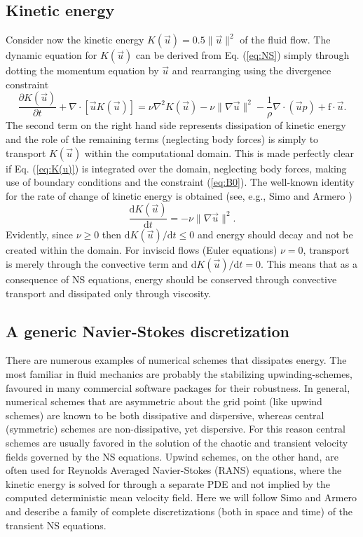 \subsection{Kinetic energy}
\label{sec:kinetic}
Consider now the kinetic energy $K(\vec{u})=0.5 \| \vec{u}\|^2$ of the
fluid flow. The dynamic equation for $K(\vec{u})$ can be derived from
Eq. (\ref{eq:NS}) simply through dotting the momentum equation by
$\vec{u}$ and rearranging using the divergence constraint
\begin{equation}
 \frac{\partial K(\vec{u})}{\partial t} + \nabla \cdot [\vec{u}K(\vec{u})] = \nu \nabla^2 K(\vec{u}) -\nu \| \nabla \vec{u} \|^2 - \frac{1}{\rho}\nabla \cdot \left(\vec{u}p \right) +\text{f}\cdot \vec{u}.
 \label{eq:K(u)}
\end{equation}
The second term on the right hand side represents dissipation of
kinetic energy and the role of the remaining terms (neglecting body
forces) is simply to transport $K(\vec{u})$ within the computational
domain. This is made perfectly clear if Eq. (\ref{eq:K(u)}) is
integrated over the domain, neglecting body forces, making use of
boundary conditions and the constraint (\ref{eq:B0}). The well-known
identity for the rate of change of kinetic energy is obtained (see,
e.g., Simo and Armero \cite{simo94})
\begin{equation}
 \frac{\text{d} K(\vec{u})}{\text{d} t} = -\nu \| \nabla \vec{u} \|^2.
\end{equation}
Evidently, since $\nu \ge 0$ then $\text{d} K(\vec{u})/\text{d} t \le
0$ and energy should decay and not be created within the domain. For
inviscid flows (Euler equations) $\nu=0$, transport is merely through
the convective term and $\text{d} K(\vec{u})/\text{d} t = 0$. This
means that as a consequence of NS equations, energy should be
conserved through convective transport and dissipated only through
viscosity.

\subsection{A generic Navier-Stokes discretization}
\label{sec:NS-solver}
There are numerous examples of numerical schemes that dissipates energy. The most familiar in fluid mechanics are probably the stabilizing upwinding-schemes, favoured in many commercial software packages for their robustness. In general, numerical schemes that are asymmetric about the grid point (like upwind schemes) are known to be both dissipative and dispersive, whereas central (symmetric) schemes are non-dissipative, yet dispersive. For this reason central schemes are usually favored in the solution of the chaotic and transient velocity fields governed by the NS equations. Upwind schemes, on the other hand, are often used for Reynolds Averaged Navier-Stokes (RANS) equations, where the kinetic energy is solved for through a separate PDE and not implied by the computed deterministic mean velocity field. Here we will follow Simo and Armero \cite{simo94} and describe a family of complete discretizations (both in space and time) of the transient NS equations.

